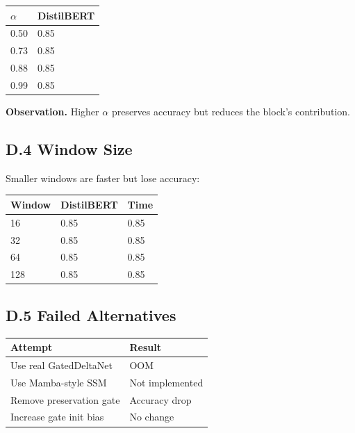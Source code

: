 \begin{table}[H]
\centering
\small
\begin{tabular}{ll}
\toprule
\textbf{$\alpha$} & \textbf{DistilBERT} \\
\midrule
0.50 & 0.85 \\
0.73 & 0.85 \\
0.88 & 0.85 \\
0.99 & 0.85 \\
\bottomrule
\end{tabular}
\end{table}

\textbf{Observation.} Higher $\alpha$ preserves accuracy but reduces the block's 
contribution.

\subsection{D.4 Window Size}

Smaller windows are faster but lose accuracy:

\begin{table}[H]
\centering
\small
\begin{tabular}{lll}
\toprule
\textbf{Window} & \textbf{DistilBERT} & \textbf{Time} \\
\midrule
16 & 0.85 & 0.85 \\
32 & 0.85 & 0.85 \\
64 & 0.85 & 0.85 \\
128 & 0.85 & 0.85 \\
\bottomrule
\end{tabular}
\end{table}

\subsection{D.5 Failed Alternatives}

\begin{table}[H]
\centering
\small
\begin{tabular}{ll}
\toprule
\textbf{Attempt} & \textbf{Result} \\
\midrule
Use real GatedDeltaNet & OOM \\
Use Mamba-style SSM & Not implemented \\
Remove preservation gate & Accuracy drop \\
Increase gate init bias & No change \\
\bottomrule
\end{tabular}
\end{table}

